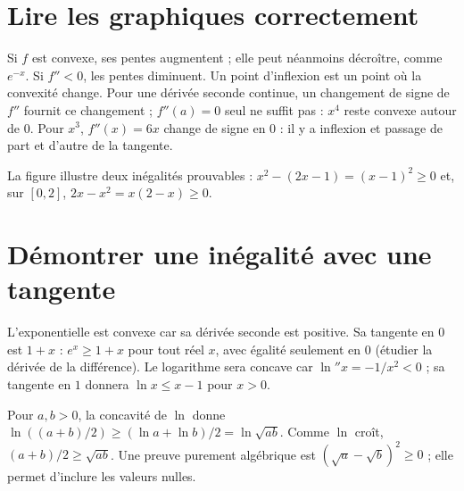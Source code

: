 \documentclass[../cours_tle.tex]{subfiles}
\begin{document}
\section{Lire les graphiques correctement}
Si $f$ est convexe, ses pentes augmentent ; elle peut néanmoins décroître, comme $e^{-x}$. Si $f''<0$, les pentes diminuent.
Un point d'inflexion est un point où la convexité change. Pour une dérivée seconde continue, un changement de signe de $f''$ fournit ce changement ; $f''(a)=0$ seul ne suffit pas : $x^4$ reste convexe autour de $0$.
Pour $x^3$, $f''(x)=6x$ change de signe en $0$ : il y a inflexion et passage de part et d'autre de la tangente.
\begin{center}
\end{center}
La figure illustre deux inégalités prouvables : $x^2-(2x-1)=(x-1)^2\ge0$ et, sur $[0,2]$, $2x-x^2=x(2-x)\ge0$.
\section{Démontrer une inégalité avec une tangente}
L'exponentielle est convexe car sa dérivée seconde est positive. Sa tangente en $0$ est $1+x$ : $e^x\ge1+x$ pour tout réel $x$, avec égalité seulement en $0$ (étudier la dérivée de la différence).
Le logarithme sera concave car $\ln''x=-1/x^2<0$ ; sa tangente en $1$ donnera $\ln x\le x-1$ pour $x>0$.

\begin{exemple}
Pour $a,b>0$, la concavité de $\ln$ donne
$\ln((a+b)/2)\ge(\ln a+\ln b)/2=\ln\sqrt{ab}$.
Comme $\ln$ croît, $(a+b)/2\ge\sqrt{ab}$.
Une preuve purement algébrique est $(\sqrt a-\sqrt b)^2\ge0$ ; elle permet d'inclure les valeurs nulles.
\end{exemple}
\end{document}
